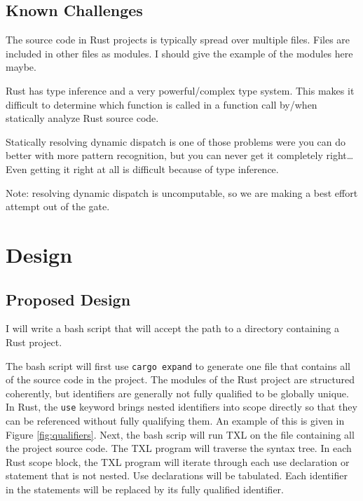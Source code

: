 \documentclass[11pt]{article}
\begin{document}
\subsection{Known Challenges}

The source code in Rust projects is typically spread over multiple files.
Files are included in other files as modules.
I should give the example of the modules here maybe.

Rust has type inference and a very powerful/complex type system.
This makes it difficult to determine which function is called in a function call by/when statically analyze Rust source code.

Statically resolving dynamic dispatch is one of those problems were you can do better with more pattern recognition, but you can never get it completely right\dots
Even getting it right at all is difficult because of type inference.

Note: resolving dynamic dispatch is uncomputable, so we are making a best effort attempt out of the gate.


\section{Design}

\subsection{Proposed Design}

I will write a bash script that will accept the path to a directory containing a Rust project.

The bash script will first use \lstinline{cargo expand} to generate one file that contains all of the source code in the project.
The modules of the Rust project are structured coherently, but identifiers are generally not fully qualified to be globally unique.
In Rust, the \lstinline{use} keyword brings nested identifiers into scope directly so that they can be referenced without fully qualifying them.
An example of this is given in Figure \ref{fig:qualifiers}.
Next, the bash scrip will run TXL on the file containing all the project source code.
The TXL program will traverse the syntax tree.
In each Rust scope block, the TXL program will iterate through each use declaration or statement that is not nested.
Use declarations will be tabulated.
Each identifier in the statements will be replaced by its fully qualified identifier.
\end{document}
